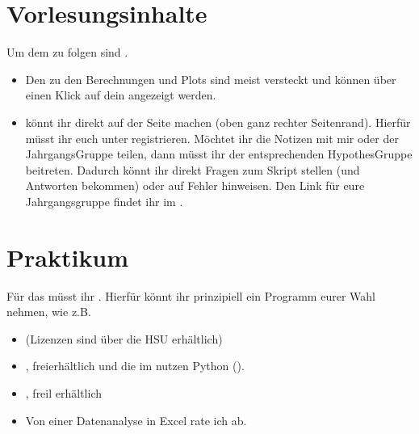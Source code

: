 \documentclass[letterpaper,10pt,english]{jupyterBook}
\begin{document}
\section{Vorlesungsinhalte}
\label{\detokenize{content/00_jupyter:vorlesungsinhalte}}
\sphinxAtStartPar
Um dem  zu folgen sind .
\begin{itemize}
\item {} 
\sphinxAtStartPar
Den  zu den Berechnungen und Plots sind meist versteckt und können über einen Klick auf dein  angezeigt werden.

\item {} 
\sphinxAtStartPar
{} könnt ihr direkt auf der Seite machen (oben ganz rechter Seitenrand). Hierfür müsst ihr euch unter  registrieren. Möchtet ihr die Notizen mit mir oder der Jahrgangs\sphinxhyphen{}Gruppe teilen, dann müsst ihr der entsprechenden Hypothes\sphinxhyphen{}Gruppe beitreten. Dadurch könnt ihr direkt Fragen zum Skript stellen (und Antworten bekommen) oder auf Fehler hinweisen. Den Link für eure Jahrgangsgruppe findet ihr im .

\end{itemize}


\section{Praktikum}
\label{\detokenize{content/00_jupyter:praktikum}}
\sphinxAtStartPar
Für das  müsst ihr {\hyperref[\detokenize{content/1_Datenanalyse::doc}]{}}. Hierfür könnt ihr prinzipiell ein Programm eurer Wahl nehmen, wie z.B.
\begin{itemize}
\item {} 
\sphinxAtStartPar
{} (Lizenzen sind über die HSU erhältlich)

\item {} 
\sphinxAtStartPar
{}, frei\sphinxhyphen{}erhältlich und die {\hyperref[\detokenize{content/T_Tutorials::doc}]{}} im  nutzen Python ().

\item {} 
\sphinxAtStartPar
{}, freil erhältlich

\item {} 
\sphinxAtStartPar
Von einer Datenanalyse in Excel rate ich ab.

\end{itemize}
\end{document}
